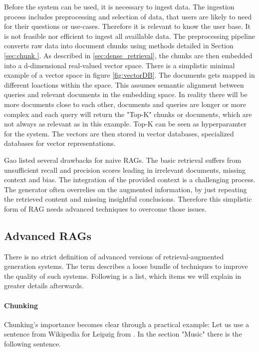 Before the system can be used, it is necessary to ingest data. The ingestion process includes preprocessing and selection of data, that users are likely to need for their questions or use-cases. Therefore it is relevant to know the user base. It is not feasible nor efficient to ingest all availlable data. The preprocessing pipeline converts raw data into document chunks using methods detailed in Section \ref{sec:chunk }. As described in \ref{sec:dense_retrieval}, the chunks are then embedded into a d-dimensional real-valued vector space. There is a simplistic minimal example of a vector space in figure \ref{fig:vectorDB}. The documents gets mapped in different loactions within the space. This assumes semantic alignment between queries and relevant documents in the embedding space. In reality there will be more documents close to each other, documents and queries are longer or more complex and each query will return the "Top-K" chunks or documents, which are not always as relevant as in this example. Top-K can be seen as hyperparamter for the system. The vectors are then stored in vector databases, specialized databases for vector representations.


Gao \cite{Gao.18.12.2023} listed several drawbacks for naive RAGs. The basic retrieval suffers from unsufficient recall and precision scores leading in irrelevant documents, missing context and bias. The integration of the provided context is a challenging process. The generator often overrelies on the augmented information, by just repeating the retrieved content and missing insightful conclusions. Therefore this simplistic form of RAG needs advanced techniques to overcome those issues. 

\subsection{Advanced RAGs}
\label{sec:advanced_rags}

There is no strict definition of advanced versions of retrieval-augmented generation systems. The term describes a loose bundle of techniques to improve the quality of such systems. Following is a list, which items we will explain in greater details afterwards.

\paragraph{Chunking}
\label{sec:chunk}
Chunking's importance becomes clear through a practical example: Let us use a sentence from Wikipedia \cite{LeipzigWikipedia.2025} for Leipzig from \citeyear{LeipzigWikipedia.2025}. In the section "Music" there is the following sentence. 

